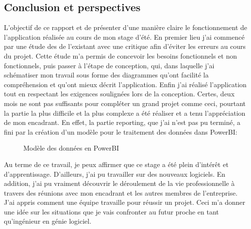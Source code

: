\documentclass[a4paper]{report}
\begin{document}
\begin{doublespace}
\chapter{Conclusion et perspectives}

L’objectif de ce rapport et de présenter d’une manière claire le fonctionnement de l'application
réalisée au cours de mon stage d’été. En premier lieu j'ai commencé par
une étude des de l’existant avec une critique afin d'éviter les erreurs au cours du
projet.
Cette étude m'a permis de concevoir les besoins fonctionnels et non fonctionnels, puis passer
à l’étape de conception, qui, dans laquelle j'ai schématiser mon travail sous forme des
diagrammes qu'ont facilité la compréhension et qu'ont mieux décrit l'application.
Enfin j'ai réalisé l'application tout en respectant les exigences soulignées lors de
la conception. Certes, deux mois ne sont pas suffisants pour compléter un grand projet comme ceci,
pourtant la partie la plus difficile et la plus complexe a été réaliser et  a tenu l'appréciation de mon
encadrant. En effet, la partie reporting, que j'ai n'est pas pu terminé, a fini par la création d'un
modèle pour le traitement des données dans PowerBI:
\begin{figure}[H]
	\begin{center}
		\caption{Modèle des données en PowerBI }
	\end{center}
\end{figure}

Au terme de ce travail, je peux affirmer que ce
stage a été plein d’intérêt et d'apprentissage. D'ailleurs, j'ai pu travailler sur des nouveaux logiciels.
En addition, j'ai pu vraiment découvrir le déroulement de la vie professionnelle à travers des réunions
avec mon encadrant et les autres membres de l’entreprise.
J'ai appris comment une équipe travaille pour réussir un projet. Ceci m'a donner une
idée sur les situations que je vais confronter au futur proche en tant qu'ingénieur en génie logiciel.


\end{doublespace}
\end{document}
